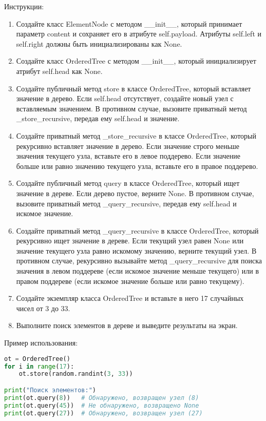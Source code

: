 \begin{enumerate}
Инструкции:
\begin{enumerate}
    \item Создайте класс ElementNode с методом \_\_init\_\_, который принимает параметр content и сохраняет его в атрибуте self.payload. Атрибуты self.left и self.right должны быть инициализированы как None.
    \item Создайте класс OrderedTree с методом \_\_init\_\_, который инициализирует атрибут self.head как None.
    \item Создайте публичный метод store в классе OrderedTree, который вставляет значение в дерево. Если self.head отсутствует, создайте новый узел с вставляемым значением. В противном случае, вызовите приватный метод \_store\_recursive, передав ему self.head и значение.
    \item Создайте приватный метод \_store\_recursive в классе OrderedTree, который рекурсивно вставляет значение в дерево. Если значение строго меньше значения текущего узла, вставьте его в левое поддерево. Если значение больше или равно значению текущего узла, вставьте его в правое поддерево.
    \item Создайте публичный метод query в классе OrderedTree, который ищет значение в дереве. Если дерево пустое, верните None. В противном случае, вызовите приватный метод \_query\_recursive, передав ему self.head и искомое значение.
    \item Создайте приватный метод \_query\_recursive в классе OrderedTree, который рекурсивно ищет значение в дереве. Если текущий узел равен None или значение текущего узла равно искомому значению, верните текущий узел. В противном случае, рекурсивно вызывайте метод \_query\_recursive для поиска значения в левом поддереве (если искомое значение меньше текущего) или в правом поддереве (если искомое значение больше или равно текущему).
    \item Создайте экземпляр класса OrderedTree и вставьте в него 17 случайных чисел от 3 до 33.
    \item Выполните поиск элементов в дереве и выведите результаты на экран.
\end{enumerate}

Пример использования:
\begin{lstlisting}[language=Python]
ot = OrderedTree()
for i in range(17):
    ot.store(random.randint(3, 33))

print("Поиск элементов:")
print(ot.query(8))   # Обнаружено, возвращен узел (8)
print(ot.query(45))  # Не обнаружено, возвращено None
print(ot.query(27))  # Обнаружено, возвращен узел (27)
\end{lstlisting}


\end{enumerate}
